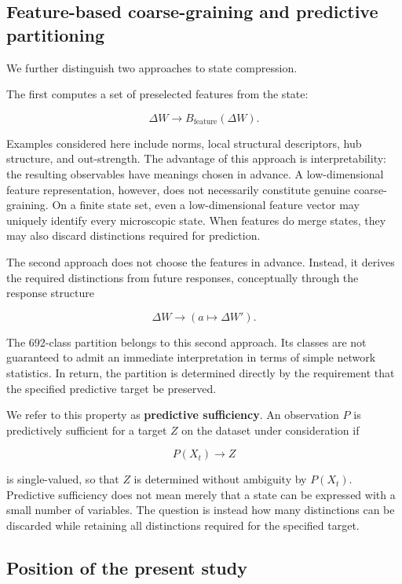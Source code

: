 \documentclass[
  11pt,
]{article}
\begin{document}
\hypertarget{feature-based-coarse-graining-and-predictive-partitioning}{%
\subsection{Feature-based coarse-graining and predictive
partitioning}\label{feature-based-coarse-graining-and-predictive-partitioning}}

We further distinguish two approaches to state compression.

The first computes a set of preselected features from the state:

\[{\Delta W\longrightarrow B_{\mathrm{feature}}(\Delta W).}\]

Examples considered here include norms, local structural descriptors,
hub structure, and out-strength. The advantage of this approach is
interpretability: the resulting observables have meanings chosen in
advance. A low-dimensional feature representation, however, does not
necessarily constitute genuine coarse-graining. On a finite state set,
even a low-dimensional feature vector may uniquely identify every
microscopic state. When features do merge states, they may also discard
distinctions required for prediction.

The second approach does not choose the features in advance. Instead, it
derives the required distinctions from future responses, conceptually
through the response structure

\[{\Delta W\longrightarrow\left(a\longmapsto\Delta W'\right).}\]

The 692-class partition belongs to this second approach. Its classes are
not guaranteed to admit an immediate interpretation in terms of simple
network statistics. In return, the partition is determined directly by
the requirement that the specified predictive target be preserved.

We refer to this property as \textbf{predictive sufficiency}. An
observation \({P}\) is predictively sufficient for a target \({Z}\) on
the dataset under consideration if

\[{P(X_t)\longrightarrow Z}\]

is single-valued, so that \({Z}\) is determined without ambiguity by
\({P(X_t)}\). Predictive sufficiency does not mean merely that a state
can be expressed with a small number of variables. The question is
instead how many distinctions can be discarded while retaining all
distinctions required for the specified target.

\hypertarget{position-of-the-present-study}{%
\subsection{Position of the present
study}\label{position-of-the-present-study}}
\end{document}
